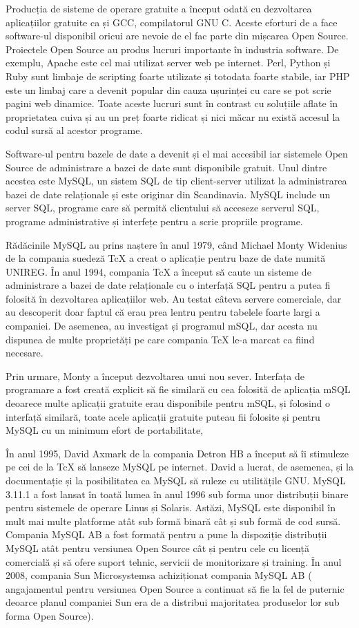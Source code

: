 \documentclass[12pt]{book}
\begin{document}
Producția de sisteme de operare gratuite a început odată cu dezvoltarea aplicațiilor gratuite ca și GCC, compilatorul GNU C. Aceste eforturi de a face software-ul disponibil oricui are nevoie de el fac parte din mișcarea Open Source. Proiectele Open Source au produs lucruri importante în industria software. De exemplu, Apache este cel mai utilizat server web pe internet. Perl, Python și Ruby sunt limbaje de scripting foarte utilizate și totodata foarte stabile, iar PHP este un limbaj care a devenit popular din cauza ușurinței cu care se pot scrie pagini web dinamice. Toate aceste lucruri sunt în contrast cu soluțiile aflate în proprietatea cuiva și au un preț foarte ridicat și nici măcar nu există accesul la codul sursă al acestor programe. 

Software-ul pentru bazele de date a devenit și el mai accesibil iar sistemele Open Source de administrare a bazei de date sunt disponibile gratuit. Unul dintre acestea este MySQL, un sistem SQL de tip client-server utilizat la administrarea bazei de date relaționale și este originar din Scandinavia. MySQL include un server SQL, programe care să permită clientului să acceseze serverul SQL, programe administrative și interfețe pentru a scrie propriile programe.

Rădăcinile MySQL au prins naștere în anul 1979, când Michael Monty Widenius de la compania suedeză TcX a creat o aplicație pentru baze de date numită UNIREG. În anul 1994, compania TcX a început să caute un sisteme de administrare a bazei de date relaționale cu o interfață SQL pentru a putea fi folosită în dezvoltarea aplicațiilor web. Au testat câteva servere comerciale, dar au descoperit doar faptul că erau prea lentru pentru tabelele foarte largi a companiei. De asemenea, au investigat și programul mSQL, dar acesta nu dispunea de multe proprietăți pe care compania TcX le-a marcat ca fiind necesare. 

Prin urmare, Monty a început dezvoltarea unui nou sever. Interfața de programare a fost creată explicit să fie similară cu cea folosită de aplicația mSQL deoarece multe aplicații gratuite erau disponibile pentru mSQL, și folosind o interfață similară, toate acele aplicații gratuite puteau fii folosite și pentru MySQL cu un minimum efort de portabilitate, 

În anul 1995, David Axmark de la compania Detron HB a început să îi stimuleze pe cei de la TcX să lanseze MySQL pe internet. David a lucrat, de asemenea, și la documentație și la posibilitatea ca MySQL să ruleze cu utilitățile GNU. MySQL 3.11.1 a fost lansat în toată lumea în anul 1996 sub forma unor distribuții binare pentru sistemele de operare Linus și Solaris. Astăzi, MySQL este disponibil în mult mai multe platforme atât sub formă binară cât și sub formă de cod sursă. Compania MySQL AB a fost formată pentru a pune la dispoziție distribuții MySQL atât pentru versiunea Open Source cât și pentru cele cu licență comercială și să ofere suport tehnic, servicii de monitorizare și training. În anul 2008, compania Sun Microsystemsa achiziționat compania MySQL AB ( angajamentul pentru versiunea Open Source a continuat să fie la fel de puternic deoarce planul companiei Sun era de a distribui majoritatea produselor lor sub forma Open Source).
\end{document}
